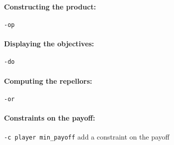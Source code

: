 \documentclass{article}
\begin{document}
\paragraph{Constructing the product:}
\texttt{-op}

\paragraph{Displaying the objectives:}
\texttt{-do}

\paragraph{Computing the repellors:}
\texttt{-or}

\paragraph{Constraints on the payoff:}
\texttt{-c player min\_payoff} add a constraint on the payoff
\end{document}
